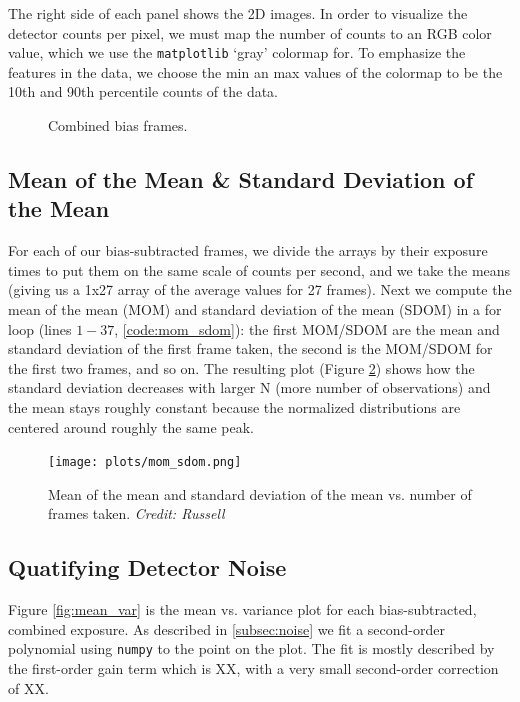 \documentclass[preprint]{aastex62}
\begin{document}
The right side of each panel shows the 2D images. In order to visualize the detector counts per pixel, we must map the number of counts to an RGB color value, which we use the {\tt matplotlib} `gray' colormap for. To emphasize the features in the data, we choose the min an max values of the colormap to be the 10th and 90th percentile counts of the data.

\begin{figure}[H]
\caption{Combined bias frames.} \label{fig:bias}
\end{figure}

\subsection{Mean of the Mean \& Standard Deviation of the Mean}
For each of our bias-subtracted frames, we divide the arrays by their exposure times to put them on the same scale of counts per second, and we take the means (giving us a 1x27 array of the average values for 27 frames). Next we compute the mean of the mean (MOM) and standard deviation of the mean (SDOM) in a for loop (lines $1-37$, \ref{code:mom_sdom}): the first MOM/SDOM are the mean and standard deviation of the first frame taken, the second is the MOM/SDOM for the first two frames, and so on. The resulting plot (Figure \ref{fig:mom_sdom}) shows how the standard deviation decreases with larger N (more number of observations) and the mean stays roughly constant because the normalized distributions are centered around roughly the same peak.

\begin{figure}[H]
\begin{center}
\texttt{[image: plots/mom\_sdom.png]}
\caption{Mean of the mean and standard deviation of the mean vs. number of frames taken. \textit{Credit: Russell}} \label{fig:mom_sdom}
\end{center}
\end{figure}

\subsection{Quatifying Detector Noise}
Figure \ref{fig:mean_var} is the mean vs. variance plot for each bias-subtracted, combined exposure. As described in \ref{subsec:noise} we fit a second-order polynomial using {\tt numpy} to the point on the plot. The fit is mostly described by the first-order gain term which is XX, with a very small second-order correction of XX.
\end{document}
